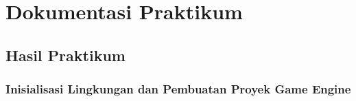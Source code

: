 %

\chapter{Dokumentasi Praktikum}
\label{chap:dokumentasipraktikum}

\section{Hasil Praktikum}
\label{sec:hasilpraktikum}

\subsection{Inisialisasi Lingkungan dan Pembuatan Proyek Game Engine}

